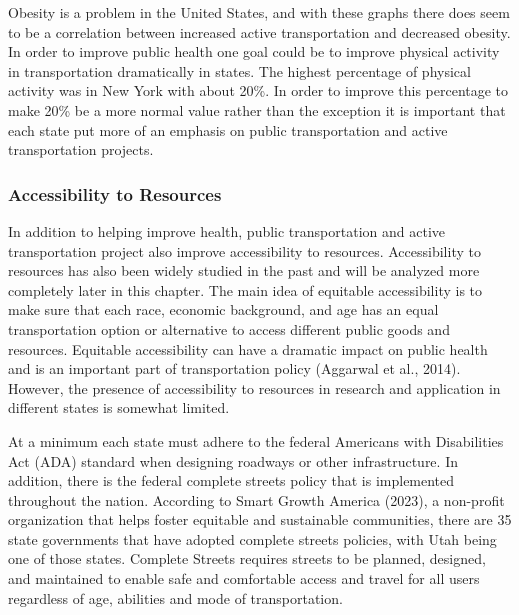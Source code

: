 \documentclass[
  letterpaper,
  authoryear,
  review,
  3p]{elsarticle}
\begin{document}
Obesity is a problem in the United States, and with these graphs there
does seem to be a correlation between increased active transportation
and decreased obesity. In order to improve public health one goal could
be to improve physical activity in transportation dramatically in
states. The highest percentage of physical activity was in New York with
about 20\%. In order to improve this percentage to make 20\% be a more
normal value rather than the exception it is important that each state
put more of an emphasis on public transportation and active
transportation projects.

\hypertarget{accessibility-to-resources}{%
\subsubsection{Accessibility to
Resources}\label{accessibility-to-resources}}

In addition to helping improve health, public transportation and active
transportation project also improve accessibility to resources.
Accessibility to resources has also been widely studied in the past and
will be analyzed more completely later in this chapter. The main idea of
equitable accessibility is to make sure that each race, economic
background, and age has an equal transportation option or alternative to
access different public goods and resources. Equitable accessibility can
have a dramatic impact on public health and is an important part of
transportation policy (Aggarwal et al., 2014). However, the presence of
accessibility to resources in research and application in different
states is somewhat limited.

At a minimum each state must adhere to the federal Americans with
Disabilities Act (ADA) standard when designing roadways or other
infrastructure. In addition, there is the federal complete streets
policy that is implemented throughout the nation. According to Smart
Growth America (2023), a non-profit organization that helps foster
equitable and sustainable communities, there are 35 state governments
that have adopted complete streets policies, with Utah being one of
those states. Complete Streets requires streets to be planned, designed,
and maintained to enable safe and comfortable access and travel for all
users regardless of age, abilities and mode of transportation.
\end{document}
